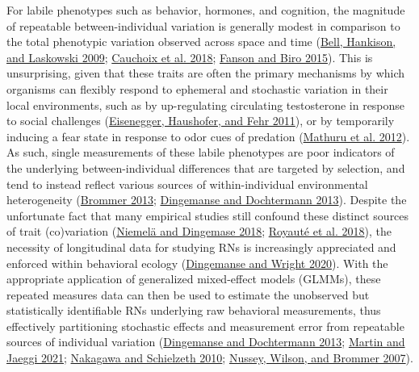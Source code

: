 \documentclass{article}
\begin{document}
For labile phenotypes such as behavior, hormones, and cognition, the
magnitude of repeatable between-individual variation is generally modest
in comparison to the total phenotypic variation observed across space
and time (\protect\hyperlink{ref-Bell2009}{Bell, Hankison, and Laskowski
2009}; \protect\hyperlink{ref-Cauch2018}{Cauchoix et al. 2018};
\protect\hyperlink{ref-Fanson2019}{Fanson and Biro 2015}). This is
unsurprising, given that these traits are often the primary mechanisms
by which organisms can flexibly respond to ephemeral and stochastic
variation in their local environments, such as by up-regulating
circulating testosterone in response to social challenges
(\protect\hyperlink{ref-Eis2011}{Eisenegger, Haushofer, and Fehr 2011}),
or by temporarily inducing a fear state in response to odor cues of
predation (\protect\hyperlink{ref-Mathuru2012}{Mathuru et al. 2012}). As
such, single measurements of these labile phenotypes are poor indicators
of the underlying between-individual differences that are targeted by
selection, and tend to instead reflect various sources of
within-individual environmental heterogeneity
(\protect\hyperlink{ref-Brommer2013}{Brommer 2013};
\protect\hyperlink{ref-DingDocht2013}{Dingemanse and Dochtermann 2013}).
Despite the unfortunate fact that many empirical studies still confound
these distinct sources of trait (co)variation
(\protect\hyperlink{ref-Niem2018}{Niemelä and Dingemase 2018};
\protect\hyperlink{ref-Roy2018}{Royauté et al. 2018}), the necessity of
longitudinal data for studying RNs is increasingly appreciated and
enforced within behavioral ecology
(\protect\hyperlink{ref-Ding2020}{Dingemanse and Wright 2020}). With the
appropriate application of generalized mixed-effect models (GLMMs),
these repeated measures data can then be used to estimate the unobserved
but statistically identifiable RNs underlying raw behavioral
measurements, thus effectively partitioning stochastic effects and
measurement error from repeatable sources of individual variation
(\protect\hyperlink{ref-DingDocht2013}{Dingemanse and Dochtermann 2013};
\protect\hyperlink{ref-Martin2021}{Martin and Jaeggi 2021};
\protect\hyperlink{ref-Naka2010}{Nakagawa and Schielzeth 2010};
\protect\hyperlink{ref-Nus2007}{Nussey, Wilson, and Brommer 2007}).
\end{document}
